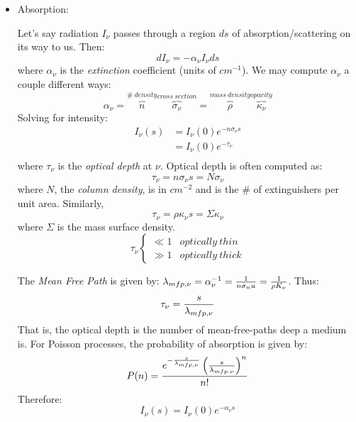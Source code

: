 \documentclass[11pt]{article}
\def\inv#1{{1 \over #1}}
\begin{document}
\begin{itemize}
\item  Absorption:\par
Let's say radiation $I_\nu$ passes through a region $ds$ of 
absorption/scattering on its way to us. Then:
$$dI_\nu=-\alpha_\nu I_\nu ds$$
where $\alpha_\nu$ is the {\it extinction} coefficient (units of $cm^{-1}$).
We may compute $\alpha_\nu$ a couple different ways:
$$\alpha_\nu=\overbrace{n}^{\#\ density}
\overbrace{\sigma_\nu}^{cross\ section}
=\overbrace{\rho}^{mass\ density}\overbrace{\kappa_\nu}^{opacity}$$
Solving for intensity:
$$\begin{aligned}I_\nu(s)&=I_\nu(0)e^{-n\sigma_\nu s}\\ 
&=I_\nu(0)e^{-\tau_\nu}\\ \end{aligned}$$
where $\tau_\nu$ is the {\it optical depth} at $\nu$.
Optical depth is often computed as:
$$\tau_\nu=n\sigma_\nu s=N\sigma_\nu$$ 
where $N$, the {\it column density}, is in $cm^{-2}$ and is the \# of 
extinguishers per unit area.
Similarly, 
$$\tau_\nu=\rho\kappa_\nu s=\Sigma\kappa_\nu$$
where $\Sigma$ is the mass surface density.
$$\tau_\nu\begin{cases}\ll 1 &optically\ thin\\
\gg 1 &optically\ thick\end{cases}$$

\def\mfp{\lambda_{mfp,\nu}}
The {\it Mean Free Path} is given by: $\mfp=\alpha_\nu^{-1}=\inv{n\sigma_nu}
=\inv{\rho K_\nu}$. Thus:
$$\tau_\nu={s\over\mfp}$$
That is, the optical depth is the number of mean-free-paths deep a medium is.
For Poisson processes, the probability of absorption is given by:
$$P(n)={e^{-{s\over\mfp}}\left({s\over\mfp}\right)^n\over n!}$$
Therefore:
$$I_\nu(s)=I_\nu(0)e^{-\alpha_\nu s}$$


\end{itemize}
\end{document}
